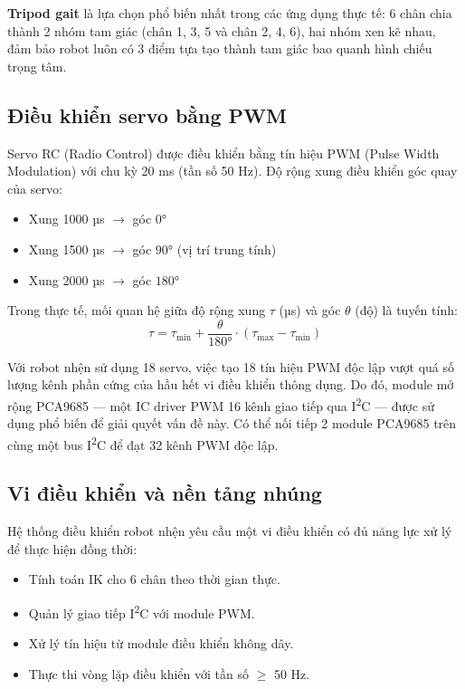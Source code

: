         \textbf{Tripod gait} là lựa chọn phổ biến nhất trong các ứng dụng thực tế: 6 chân chia thành 2 nhóm tam giác (chân 1, 3, 5 và chân 2, 4, 6), hai nhóm xen kẽ nhau, đảm bảo robot luôn có 3 điểm tựa tạo thành tam giác bao quanh hình chiếu trọng tâm.

        \subsection{Điều khiển servo bằng PWM}

        \hspace{0.5cm} Servo RC (Radio Control) được điều khiển bằng tín hiệu PWM (Pulse Width Modulation) với chu kỳ 20 ms (tần số 50 Hz). Độ rộng xung điều khiển góc quay của servo:

        \begin{itemize}
            \item Xung 1000 µs $\rightarrow$ góc $0°$
            \item Xung 1500 µs $\rightarrow$ góc $90°$ (vị trí trung tính)
            \item Xung 2000 µs $\rightarrow$ góc $180°$
        \end{itemize}

        Trong thực tế, mối quan hệ giữa độ rộng xung $\tau$ (µs) và góc $\theta$ (độ) là tuyến tính:
        \begin{equation}
            \tau = \tau_{\min} + \frac{\theta}{180°} \cdot (\tau_{\max} - \tau_{\min})
        \end{equation}

        Với robot nhện sử dụng 18 servo, việc tạo 18 tín hiệu PWM độc lập vượt quá số lượng kênh phần cứng của hầu hết vi điều khiển thông dụng. Do đó, module mở rộng PCA9685 — một IC driver PWM 16 kênh giao tiếp qua I\textsuperscript{2}C — được sử dụng phổ biến để giải quyết vấn đề này. Có thể nối tiếp 2 module PCA9685 trên cùng một bus I\textsuperscript{2}C để đạt 32 kênh PWM độc lập.

        \subsection{Vi điều khiển và nền tảng nhúng}

        \hspace{0.5cm} Hệ thống điều khiển robot nhện yêu cầu một vi điều khiển có đủ năng lực xử lý để thực hiện đồng thời:

        \begin{itemize}
            \item Tính toán IK cho 6 chân theo thời gian thực.
            \item Quản lý giao tiếp I\textsuperscript{2}C với module PWM.
            \item Xử lý tín hiệu từ module điều khiển không dây.
            \item Thực thi vòng lặp điều khiển với tần số $\geq$ 50 Hz.
        \end{itemize}

